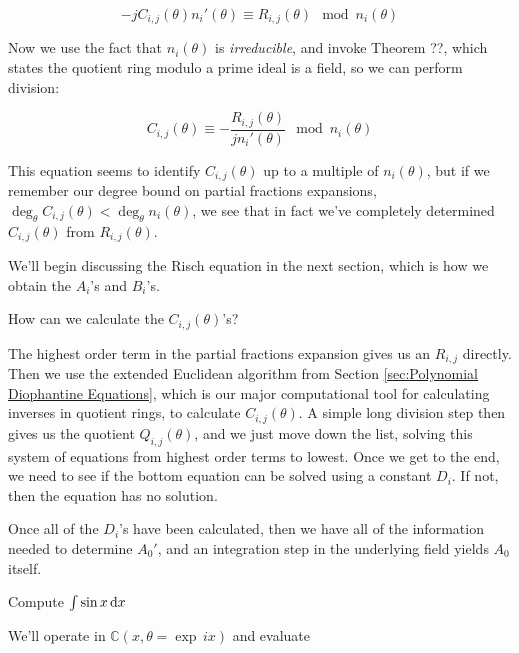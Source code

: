 $$-jC_{i,j}(\theta)n_i'(\theta) \equiv R_{i,j}(\theta) \mod n_i(\theta)$$

Now we use the fact that $n_i(\theta)$ is {\it irreducible},
and invoke Theorem ??, which states the quotient ring
modulo a prime ideal is a field, so we can perform division:

$$C_{i,j}(\theta) \equiv - \frac{R_{i,j}(\theta)}{jn_i'(\theta)} \mod n_i(\theta)$$

This equation seems to identify $C_{i,j}(\theta)$ up to a multiple of $n_i(\theta)$,
but if we remember our degree bound on partial fractions expansions,
$\deg_\theta C_{i,j}(\theta) < \deg_\theta n_i(\theta)$, we see
that in fact we've completely determined $C_{i,j}(\theta)$ from
$R_{i,j}(\theta)$.

\endtheorem

We'll begin discussing the Risch equation in the next section, which
is how we obtain the $A_i$'s and $B_i$'s.

How can we calculate the $C_{i,j}(\theta)$'s?

The highest order term in the partial fractions expansion
gives us an $R_{i,j}$ directly.  Then we use
the extended Euclidean algorithm from
Section \ref{sec:Polynomial Diophantine Equations}, which is our major
computational tool for calculating inverses in quotient rings,
to calculate $C_{i,j}(\theta)$.  A simple long division step
then gives us the quotient $Q_{i,j}(\theta)$, and we just
move down the list, solving this system of equations from highest
order terms to lowest.  Once we get to the end, we need to see if the
bottom equation can be solved using a constant $D_i$.  If not,
then the equation has no solution.

Once all of the $D_i$'s have been calculated, then we have all of the
information needed to determine $A_0'$, and an integration step in the
underlying field yields $A_0$ itself.


\begin{comment}
$$F' = \sum_{i=-l}^n (c_i' + i c_i k' )\theta^i
  + \sum_{i=1}^\nu \sum_{j=1}^{m_i} \frac{b_{ij}'(\theta) n_i(\theta) - j b_{ij}(\theta) n_i'(\theta) }{n_i(\theta)^{j+1}}
  + \sum_{i=1}^\eta d_i \frac{n_i(\theta)'}{n_i(\theta)}$$
\end{comment}

\vfil\eject

\example Compute $\int \sin x \, {\rm d}x$

We'll operate in ${\mathbb C}(x, \theta = \exp \,ix)$ and evaluate

